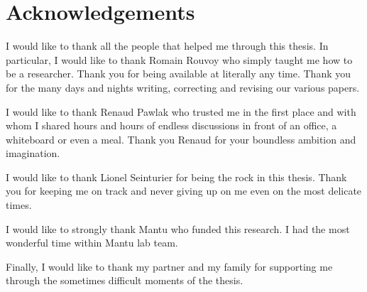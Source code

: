 \thispagestyle{empty}
\section*{Acknowledgements}

I would like to thank all the people that helped me through this thesis.
In particular, I would like to thank Romain Rouvoy who simply taught me how to be a researcher. Thank you for being available at literally any time. Thank you for the many days and nights writing, correcting and revising our various papers.

I would like to thank Renaud Pawlak who trusted me in the first place and with whom I shared hours and hours of endless discussions in front of an office, a whiteboard or even a meal. Thank you Renaud for your boundless ambition and imagination.

I would like to thank Lionel Seinturier for being the rock in this thesis. Thank you for keeping me on track and never giving up on me even on the most delicate times.

I would like to strongly thank Mantu who funded this research.
I had the most wonderful time within Mantu lab team.

Finally, I would like to thank my partner and my family for supporting me through the sometimes difficult moments of the thesis.


